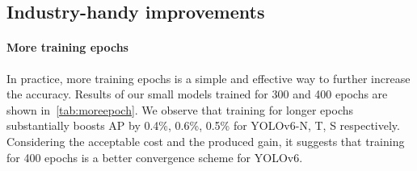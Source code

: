 \documentclass[10pt,twocolumn,letterpaper]{article}
\begin{document}
 \begin{table}
  \centering
  \caption{Effectiveness of object loss.}
  \label{tab:ablate:objloss}
\end{table}













\subsection{Industry-handy improvements}
\label{sec:ablate:further}


\begin{table}[ht]
\centering
{}
\caption{Experiments of more training epochs on small models.}
\label{tab:moreepoch}
\end{table}
\paragraph{More training epochs}
In practice, more training epochs is a simple and effective way to further increase the accuracy. Results of our small models trained for 300 and 400 epochs are shown in~\cref{tab:moreepoch}. We observe that training for longer epochs substantially boosts AP by 0.4\%, 0.6\%, 0.5\% for YOLOv6-N, T, S respectively. Considering the acceptable cost and the produced gain, it suggests that training for 400 epochs is a better convergence scheme for YOLOv6.
\end{document}
